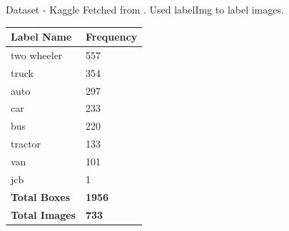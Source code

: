\documentclass{beamer}
\newcommand{\link}[2]{\href{#1}{\textit{\color{blue}{#2}}}}%
\begin{document}
	\begin{frame}[allowframebreaks]{Dataset - Kaggle}
		Fetched from \link{https://www.kaggle.com/datasets/dataclusterlabs/indian-vehicle-dataset}{Kaggle}. Used labelImg to label images. 
		\begin{table}[]
			\centering
			\begin{tabular}{|l|l|}
				\hline
				\textbf{Label Name}   & \textbf{Frequency}    \\ \hline
				two wheeler           & 557                   \\ \hline
				truck                 & 354                   \\ \hline
				auto                  & 297                   \\ \hline
				car                   & 233                   \\ \hline
				bus                   & 220                   \\ \hline
				tractor               &  133                  \\ \hline
				van                   & 101                   \\ \hline
				jcb                   & 1                     \\ \hline
				\textbf{Total Boxes}  & \textbf{1956}       \\ \hline
				\textbf{Total Images} & \textbf{733}        \\ \hline
			\end{tabular}
		\end{table}
		
		
		

\end{frame}
\end{document}
